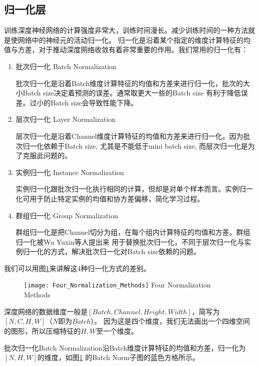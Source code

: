 \subsection{归一化层}
训练深度神经网络的计算强度非常大，训练时间漫长。减少训练时间的一种方法就是使网络中的神经元的活动归一化\cite{Ba2016LayerN}。
归一化是沿着某个指定的维度计算特征的均值与方差，对于推动深度网络收敛有着非常重要的作用。我们常用的归一化有：
\begin{enumerate}
    \item {批次归一化 Batch Normalization\cite{Ioffe2015BatchNA}}
    
    批次归一化是沿着Batch维度计算特征的均值和方差来进行归一化，批次的大小Batch size决定着预测的误差。通常取更大一些的Batch size
    有利于降低误差。过小的Batch size会导致性能下降。
    \item {层次归一化 Layer Normalization\cite{Ba2016LayerN}}
    
    层次归一化是沿着Channel维度计算特征的均值和方差来进行归一化。因为批次归一化依赖于Batch size, 尤其是不能低于mini batch size,
    而层次归一化是为了克服此问题的。
    \item {实例归一化 Instance Normalization\cite{Ulyanov2016InstanceNT}}
    
    实例归一化跟批次归一化执行相同的计算，但却是对单个样本而言。实例归一化可用于防止特定实例的均值和协方差偏移，简化学习过程。
    \item {群组归一化 Group Normalization\cite{Wu2018GroupN}}
    
    群组归一化是把Channel切分为组，在每个组内计算特征的均值和方差。群组归一化被Wu Yuxin等人\cite{Wu2018GroupN}提出来
    用于替换批次归一化，不同于层次归一化与实例归一化的方式，解决批次归一化对Batch size依赖的问题。
\end{enumerate}
我们可以用图\ref{fig:4norm}来讲解这4种归一化方式的差别。
\begin{figure}[!htp]
    \centering
    \texttt{[image: Four\_Normalization\_Methods]}
        {Four Normalization Methods}
    \label{fig:4norm}
\end{figure}
深度网络的数据维度一般是$[Batch, Channel, Height, Width]$，简写为$[N, C, H, W]$（$N$即为$Batch$）。
因为这是四个维度，我们无法画出一个四维空间的图形，所以压缩特征的$H, W$至一个维度。

批次归一化Batch Normalization沿Batch维度计算特征的均值和方差，归一化为$[N, H, W]$的维度，如图\ref{fig:4norm}
的Batch Norm子图的蓝色方格所示。

